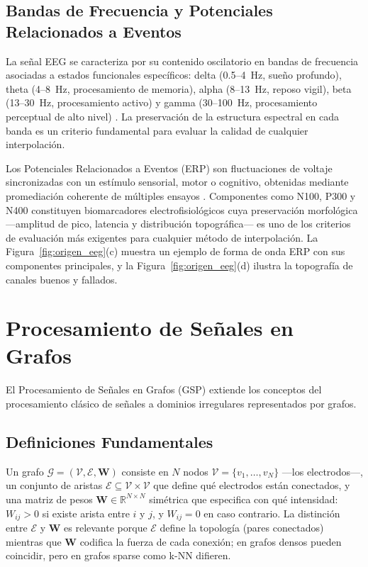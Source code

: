 \subsection{Bandas de Frecuencia y Potenciales Relacionados a Eventos}

La señal EEG se caracteriza por su contenido oscilatorio en bandas de frecuencia asociadas a estados funcionales específicos: delta (0.5--4~Hz, sueño profundo), theta (4--8~Hz, procesamiento de memoria), alpha (8--13~Hz, reposo vigil), beta (13--30~Hz, procesamiento activo) y gamma (30--100~Hz, procesamiento perceptual de alto nivel) \cite{buzsaki2006rhythms}. La preservación de la estructura espectral en cada banda es un criterio fundamental para evaluar la calidad de cualquier interpolación.

Los Potenciales Relacionados a Eventos (ERP) son fluctuaciones de voltaje sincronizadas con un estímulo sensorial, motor o cognitivo, obtenidas mediante promediación coherente de múltiples ensayos \cite{luck2014introduction}. Componentes como N100, P300 y N400 constituyen biomarcadores electrofisiológicos cuya preservación morfológica ---amplitud de pico, latencia y distribución topográfica--- es uno de los criterios de evaluación más exigentes para cualquier método de interpolación. La Figura~\ref{fig:origen_eeg}(c) muestra un ejemplo de forma de onda ERP con sus componentes principales, y la Figura~\ref{fig:origen_eeg}(d) ilustra la topografía de canales buenos y fallados.

\section{Procesamiento de Señales en Grafos}

El Procesamiento de Señales en Grafos (GSP) \cite{shuman2013,ortega2018} extiende los conceptos del procesamiento clásico de señales a dominios irregulares representados por grafos.

\subsection{Definiciones Fundamentales}

Un grafo $\mathcal{G} = (\mathcal{V}, \mathcal{E}, \mathbf{W})$ consiste en $N$ nodos $\mathcal{V} = \{v_1, \dots, v_N\}$ ---los electrodos---, un conjunto de aristas $\mathcal{E} \subseteq \mathcal{V} \times \mathcal{V}$ que define qué electrodos están conectados, y una matriz de pesos $\mathbf{W} \in \mathbb{R}^{N \times N}$ simétrica que especifica con qué intensidad: $W_{ij} > 0$ si existe arista entre $i$ y $j$, y $W_{ij} = 0$ en caso contrario. La distinción entre $\mathcal{E}$ y $\mathbf{W}$ es relevante porque $\mathcal{E}$ define la topología (pares conectados) mientras que $\mathbf{W}$ codifica la fuerza de cada conexión; en grafos densos pueden coincidir, pero en grafos sparse como k-NN difieren.


